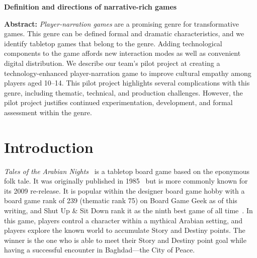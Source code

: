 \documentclass[a4paper]{article}
\newcommand{\projecttitle}{Definition and directions of narrative-rich games}
\begin{document}
\begin{center}
\fontsize{14}{16.8}\selectfont
\bf \projecttitle
\end{center}

\vspace{-0.25in}
\begin{center}
\iftoggle{blind}{
}{
Paul Gestwicki, others, Ball State University\\
pvgestwicki@bsu.edu\\
}
\end{center}

\newcommand{\totan}{\textit{TotAN}}
\newcommand{\smersh}{\textit{SMERSH}}

%
\begin{adjustwidth}{0.5in}{0.5in}
  \textbf{Abstract:} \textit{Player-narration games} are a promising
  genre for transformative games. This genre can be defined formal and
  dramatic characteristics, and we identify tabletop games that belong
  to the genre.  Adding technological components to the game affords
  new interaction modes as well as convenient digital distribution. We
  describe our team's pilot project at creating a technology-enhanced
  player-narration game to improve cultural empathy among players aged
  10--14.  This pilot project highlights several complications with
  this genre, including thematic, technical, and production
  challenges.  However, the pilot project justifies continued
  experimentation, development, and formal assessment within the
  genre.
\end{adjustwidth}

\section{Introduction}

\textit{Tales of the Arabian Nights}~\citep{Goldberg2009} is a 
tabletop board game based on the eponymous folk tale.
It was originally published in 1985~\citep{Goldberg1985} but is more commonly
known for its 2009 re-release. 
It is popular within the designer board game hobby with a board game
rank of 239 (thematic rank 75) on Board Game Geek as of this writing,
and Shut Up \& Sit Down rank it as the ninth best game of all 
time~\citep{ShutUp2015}.
In this game, players control a character within a mythical Arabian
setting, and players explore the known world to accumulate Story and
Destiny points. The winner is the one who is able to meet their 
Story and Destiny point goal while having a successful encounter
in Baghdad---the City of Peace.
\end{document}
